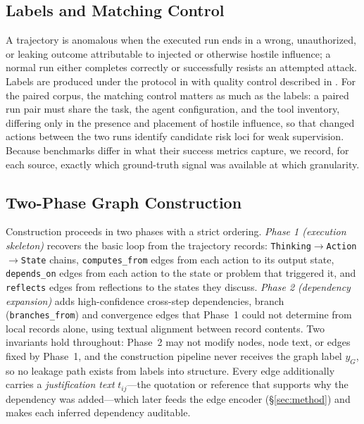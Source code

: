 \subsection{Labels and Matching Control}
A trajectory is anomalous when the executed run ends in a wrong, unauthorized, or leaking outcome attributable to injected or otherwise hostile influence; a normal run either completes correctly or successfully resists an attempted attack. Labels are produced under the protocol in  with quality control described in . For the paired corpus, the matching control matters as much as the labels: a paired run pair must share the task, the agent configuration, and the tool inventory, differing only in the presence and placement of hostile influence, so that changed actions between the two runs identify candidate risk loci for weak supervision. Because benchmarks differ in what their success metrics capture, we record, for each source, exactly which ground-truth signal was available at which granularity.

\subsection{Two-Phase Graph Construction}
Construction proceeds in two phases with a strict ordering. \emph{Phase 1 (execution skeleton)} recovers the basic loop from the trajectory records: \texttt{Thinking}$\rightarrow$\texttt{Action}$\rightarrow$\texttt{State} chains, \texttt{computes\_from} edges from each action to its output state, \texttt{depends\_on} edges from each action to the state or problem that triggered it, and \texttt{reflects} edges from reflections to the states they discuss. \emph{Phase 2 (dependency expansion)} adds high-confidence cross-step dependencies, branch (\texttt{branches\_from}) and convergence edges that Phase~1 could not determine from local records alone, using textual alignment between record contents. Two invariants hold throughout: Phase~2 may not modify nodes, node text, or edges fixed by Phase~1, and the construction pipeline never receives the graph label $y_G$, so no leakage path exists from labels into structure. Every edge additionally carries a \emph{justification text} $t_{ij}$---the quotation or reference that supports why the dependency was added---which later feeds the edge encoder (\S\ref{sec:method}) and makes each inferred dependency auditable.

